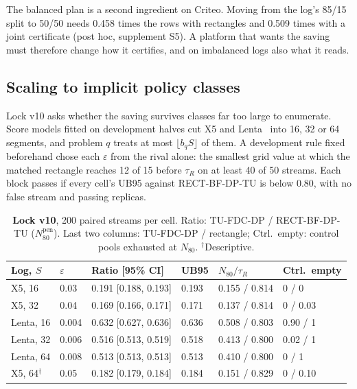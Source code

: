 \documentclass[sigconf,anonymous,review]{acmart}
\newcommand{\eps}{\varepsilon}
\newcommand{\Npen}{N_{80}^{\text{pen}}}
\begin{document}
The balanced plan is a second ingredient on Criteo. Moving from the log's 85/15 split to 50/50 needs 0.458 times the rows with rectangles and 0.509 times with a joint certificate (post hoc, supplement S5). A platform that wants the saving must therefore change how it certifies, and on imbalanced logs also what it reads.

\subsection{Scaling to implicit policy classes}\label{sec:scale}

Lock v10 asks whether the saving survives classes far too large to enumerate. Score models fitted on development halves cut X5 and Lenta~\citep{scikituplift2020} into 16, 32 or 64 segments, and problem $q$ treats at most $\lfloor b_q S \rfloor$ of them. A development rule fixed beforehand chose each $\eps$ from the rival alone: the smallest grid value at which the matched rectangle reaches 12 of 15 before $\tau_R$ on at least 40 of 50 streams. Each block passes if every cell's UB95 against RECT-BF-DP-TU is below 0.80, with no false stream and passing replicas.

\begin{table}[t]
\caption{\textbf{Lock v10}, 200 paired streams per cell. Ratio: TU-FDC-DP / RECT-BF-DP-TU ($\Npen$). Last two columns: TU-FDC-DP / rectangle; Ctrl.\ empty: control pools exhausted at $N_{80}$. $^\dagger$Descriptive.}
\label{tab:scale}
\small
\setlength{\tabcolsep}{2.6pt}
\begin{tabular}{@{}llllll@{}}
\toprule
Log, $S$ & $\eps$ & Ratio [95\% CI] & UB95 & $N_{80}/\tau_R$ & Ctrl.\ empty \\
\midrule
X5, 16 & 0.03 & 0.191 [0.188, 0.193] & 0.193 & 0.155 / 0.814 & 0 / 0 \\
X5, 32 & 0.04 & 0.169 [0.166, 0.171] & 0.171 & 0.137 / 0.814 & 0 / 0.03 \\
Lenta, 16 & 0.004 & 0.632 [0.627, 0.636] & 0.636 & 0.508 / 0.803 & 0.90 / 1 \\
Lenta, 32 & 0.006 & 0.516 [0.513, 0.519] & 0.518 & 0.413 / 0.800 & 0.02 / 1 \\
Lenta, 64 & 0.008 & 0.513 [0.513, 0.513] & 0.513 & 0.410 / 0.800 & 0 / 1 \\
X5, 64$^\dagger$ & 0.05 & 0.182 [0.179, 0.184] & 0.184 & 0.151 / 0.829 & 0 / 0.10 \\
\bottomrule
\end{tabular}
\end{table}
\end{document}
